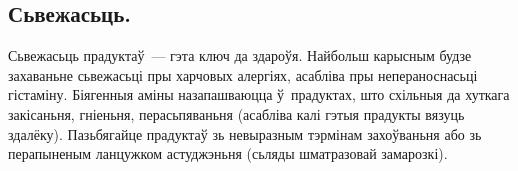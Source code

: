 \subsection{Сьвежасьць.}
Сьвежасьць прадуктаў~--- гэта ключ да здароўя. Найбольш карысным будзе захаваньне сьвежасьці пры харчовых алергіях, асабліва пры непераноснасьці гістаміну. Біягенныя аміны назапашваюцца ў~прадуктах, што схільныя да хуткага закісаньня, гніеньня, перасьпяваньня (асабліва калі гэтыя прадукты вязуць здалёку). Пазьбягайце прадуктаў зь невыразным тэрмінам захоўваньня або зь перапыненым ланцужком астуджэньня (сьляды шматразовай замарозкі).

